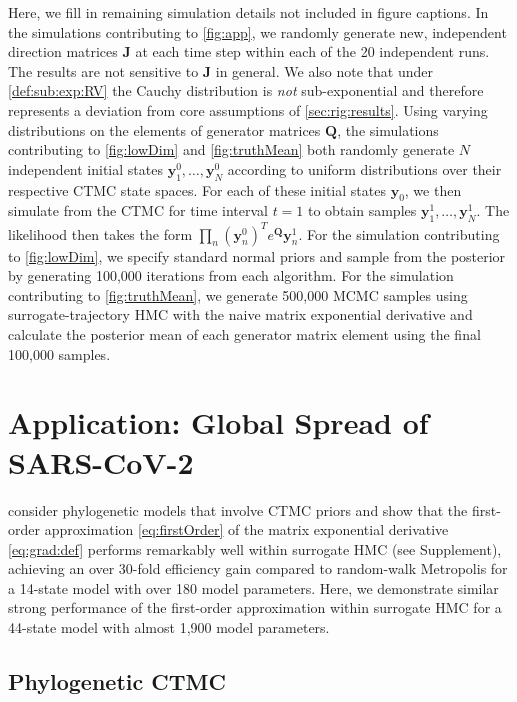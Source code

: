 \documentclass[9pt,twocolumn,twoside]{pnas-new}
\newcommand{\?}{\textbf{?}}
\newcommand{\y}{\mathbf{y}}
\newcommand{\QQ}{\mathbf{Q}}
\newcommand{\JJ}{\mathbf{J}}
\begin{document}
Here, we fill in remaining simulation details not included in figure captions. In the simulations contributing to \cref{fig:app}, we randomly generate new, independent direction matrices $\JJ$ at each time step within each of the 20 independent runs. The results are not sensitive to $\JJ$ in general.  We also note that under \cref{def:sub:exp:RV} the Cauchy distribution is \emph{not} sub-exponential and therefore represents a deviation from core assumptions of \cref{sec:rig:results}.  Using varying distributions on the elements of generator matrices $\QQ$, the simulations contributing to \cref{fig:lowDim} and \cref{fig:truthMean} both randomly generate $N$ independent initial states $\y^0_1,\dots,\y^0_N$ according to uniform distributions over their respective CTMC state spaces. For each of these initial states $\y_0$, we then simulate from the CTMC for time interval $t=1$ to obtain samples $\y^1_1,\dots,\y^1_N$.  The likelihood then takes the form $\prod_n (\y^{0}_n)^T e^{\QQ} \y^{1}_n$.  For the simulation contributing to \cref{fig:lowDim}, we specify standard normal priors and sample from the posterior by generating 100,000 iterations from each algorithm.  For the simulation contributing to \cref{fig:truthMean}, we generate 500,000 MCMC samples using surrogate-trajectory HMC with the naive matrix exponential derivative and calculate the posterior mean of each generator matrix element using the final 100,000 samples.  




\section{Application: Global Spread of SARS-CoV-2}
\label{sec:sars:cov:app}



\cite{magee2023random} consider phylogenetic models that involve CTMC
priors and show that the first-order approximation
\eqref{eq:firstOrder} of the matrix exponential derivative
\eqref{eq:grad:def} performs remarkably well within surrogate HMC (see Supplement), achieving an over 30-fold
efficiency gain compared to random-walk Metropolis for a 14-state
model with over 180 model parameters.  Here, we demonstrate similar
strong performance of the first-order approximation within surrogate
HMC for a 44-state model with almost 1,900 model parameters.



\subsection*{Phylogenetic CTMC}
\end{document}
